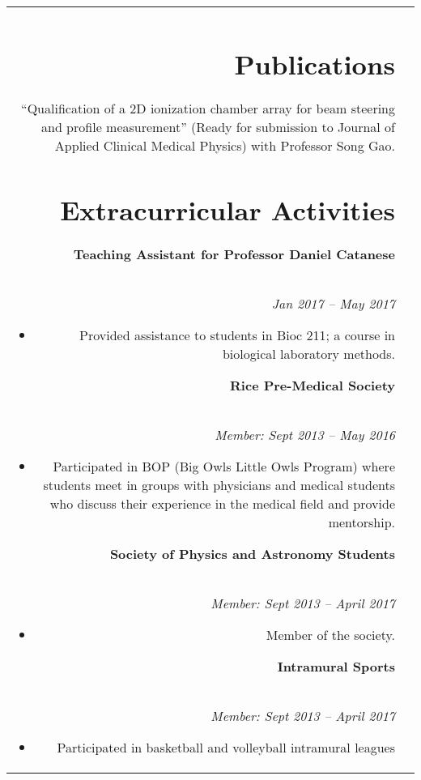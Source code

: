 \documentclass[a4paper,10pt]{article}
\begin{document}
\begin{tabular}{r|p{12cm}}
\section{Publications}
``Qualification of a 2D ionization chamber array for beam steering and profile
measurement'' (Ready for submission to Journal of Applied Clinical Medical
Physics) with Professor Song Gao.

\section{Extracurricular Activities}

\textbf{Teaching Assistant for Professor Daniel Catanese} \\
\emph{Jan 2017 -- May 2017}
\begin{itemize}[leftmargin=0.5cm, noitemsep]
  \vspace{-1ex}
  \item Provided assistance to students in Bioc 211; a course in biological
    laboratory methods.
\end{itemize}

\textbf{Rice Pre-Medical Society} \\
\emph{Member: Sept 2013 -- May 2016}
\begin{itemize}[leftmargin=0.5cm, noitemsep]
  \vspace{-1ex}
  \item Participated in BOP (Big Owls Little Owls Program) where students meet
    in groups with physicians and medical students who discuss their
    experience in the medical field and provide mentorship.
\end{itemize}

\textbf{Society of Physics and Astronomy Students}\\
\emph{Member: Sept 2013 -- April 2017}
\begin{itemize}[leftmargin=0.5cm, noitemsep]
  \vspace{-1ex}
  \item Member of the society.
\end{itemize}

\textbf{Intramural Sports}\\
\emph{Member: Sept 2013 -- April 2017}
\begin{itemize}[leftmargin=0.5cm, noitemsep]
  \vspace{-1ex}
  \item Participated in basketball and volleyball intramural leagues
\end{itemize}


\end{tabular}
\end{document}
